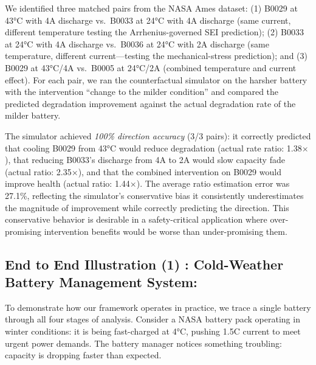 \documentclass[5p,times,authoryear]{elsarticle}
\begin{document}
We identified three matched pairs from the NASA Ames dataset: (1) B0029 at 43°C with 4A discharge vs.\ B0033 at 24°C with 4A discharge (same current, different temperature testing the Arrhenius-governed SEI prediction); (2) B0033 at 24°C with 4A discharge vs.\ B0036 at 24°C with 2A discharge (same temperature, different current—testing the mechanical-stress prediction); and (3) B0029 at 43°C/4A vs.\ B0005 at 24°C/2A (combined temperature and current effect). For each pair, we ran the counterfactual simulator on the harsher battery with the intervention ``change to the milder condition'' and compared the predicted degradation improvement against the actual degradation rate of the milder battery.

The simulator achieved \emph{100\% direction accuracy} (3/3 pairs): it correctly predicted that cooling B0029 from 43°C would reduce degradation (actual rate ratio: 1.38$\times$), that reducing B0033's discharge from 4A to 2A would slow capacity fade (actual ratio: 2.35$\times$), and that the combined intervention on B0029 would improve health (actual ratio: 1.44$\times$). The average ratio estimation error was 27.1\%, reflecting the simulator's conservative bias it consistently underestimates the magnitude of improvement while correctly predicting the direction. This conservative behavior is desirable in a safety-critical application where over-promising intervention benefits would be worse than under-promising them.



\subsection{End to End Illustration (1) :  Cold-Weather Battery Management System:}

To demonstrate how our framework operates in practice, we trace a single battery through all four stages of analysis. Consider a NASA battery pack operating in winter conditions: it is being fast-charged at 4°C, pushing 1.5C current to meet urgent power demands. The battery manager notices something troubling: capacity is dropping faster than expected.
\end{document}
